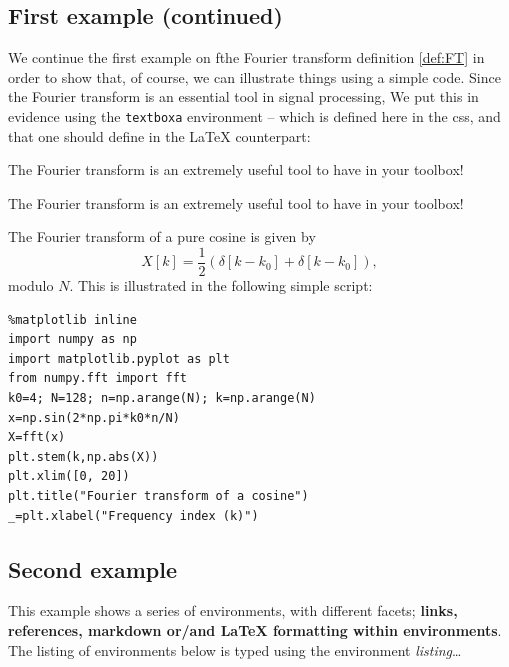     \subsection{First example (continued)}\label{first-example-continued}

    We continue the first example on fthe Fourier transform definition
\ref{def:FT} in order to show that, of course, we can illustrate things
using a simple code. Since the Fourier transform is an essential tool in
signal processing, We put this in evidence using the \texttt{textboxa}
environment -- which is defined here in the css, and that one should
define in the LaTeX counterpart:

\begin{listing}
\begin{textboxa}
The Fourier transform is an extremely useful tool to have in your toolbox!
\end{textboxa}
\end{listing}

    \begin{textboxa}
The Fourier transform is an extremely useful tool to have in your toolbox!
\end{textboxa}

    The Fourier transform of a pure cosine is given by \[
X[k] = \frac{1}{2} \left( \delta[k-k_0] + \delta[k-k_0] \right), 
\] modulo \(N\). This is illustrated in the following simple script:
%
\begin{lstlisting}
%matplotlib inline
import numpy as np
import matplotlib.pyplot as plt 
from numpy.fft import fft
k0=4; N=128; n=np.arange(N); k=np.arange(N)
x=np.sin(2*np.pi*k0*n/N)
X=fft(x)
plt.stem(k,np.abs(X))
plt.xlim([0, 20])
plt.title("Fourier transform of a cosine")
_=plt.xlabel("Frequency index (k)")
\end{lstlisting}%
    \begin{center}
    \end{center}
    
    \subsection{Second example}\label{second-example}

    This example shows a series of environments, with different facets;
\textbf{links, references, markdown or/and LaTeX formatting within
environments}. The listing of environments below is typed using the
environment \emph{listing}\ldots{}

